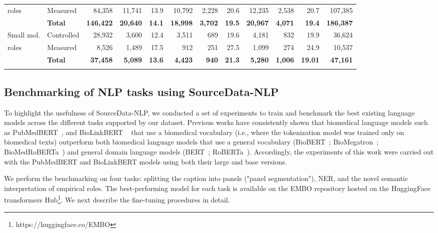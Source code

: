 \documentclass{bioinfo}
\begin{document}
\begin{methods}
\begin{table*}[]
{\begin{tabular}{@{}ll|rrr|rrr|rrr|r@{}}
roles                            & Measured        & 84,358  & 11,741 & 13.9  & 10,792   & 2,228 & 20.6  & 12,235  & 2,538 & 20.7  & 107,385 \\ 
                                 & \textbf{Total}  & \textbf{146,422}	& \textbf{20,640} & \textbf{14.1} &	\textbf{18,998} & \textbf{3,702} & \textbf{19.5} & \textbf{20,967} & \textbf{4,071} & \textbf{19.4} & \textbf{186,387}\\ \hline
Small mol.                       & Controlled      & 28,932  & 3,600  & 12.4  & 3,511  & 689    & 19.6  & 4,181     & 832    & 19.9  & 36,624 \\
roles                            & Measured        & 8,526   & 1,489  & 17.5  & 912     & 251    & 27.5  & 1,099     & 274    & 24.9  & 10,537 \\ 
                                 & \textbf{Total}  & \textbf{37,458}	& \textbf{5,089} & \textbf{13.6} &	\textbf{4,423} & \textbf{940} & \textbf{21.3} & \textbf{5,280} &	\textbf{1,006} & \textbf{19.01} & \textbf{47,161}\\ \botrule

\end{tabular}}{
}
\end{table*}

\subsection{Benchmarking of NLP tasks using SourceData-NLP}\label{sec:nlp-benchmark}

To highlight the usefulness of SourceData-NLP, we conducted a set of experiments to train and benchmark the best existing language models across the different tasks supported by our dataset. Previous works have consistently shown that biomedical language models such as PubMedBERT~\citep{pubmedbert}, and BioLinkBERT ~\citep{biolinkbert} that use a biomedical vocabulary (i.e., where the tokenization model was trained only on biomedical texts) outperform both biomedical language models that use a general vocabulary (BioBERT~\citealp{biobert}; BioMegatron~\citealp{biomegatron}; BioMedRoBERTa~\citealp{biomedroberta}) and general domain language models (BERT~\citealp{bert}; RoBERTa~\citealp{roberta}). Accordingly, the experiments of this work were carried out with the PubMedBERT and BioLinkBERT models using both their large and base versions.

We perform the benchmarking on four tasks: splitting the caption into panels ("panel segmentation"), NER, and the novel semantic interpretation of empirical roles. The best-performing model for each task is available on the EMBO repository hosted on the HuggingFace transformers Hub\footnote{https://huggingface.co/EMBO}. We next describe the fine-tuning procedures in detail.


\end{methods}
\end{document}
